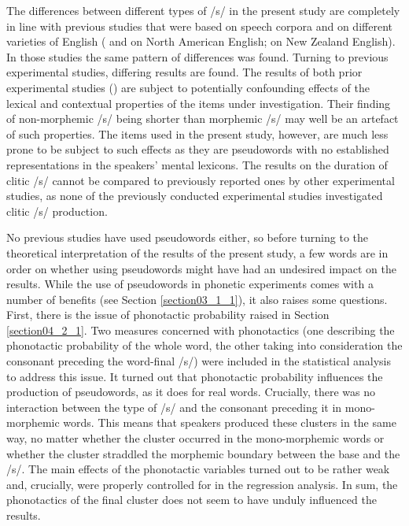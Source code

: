 The differences between different types of /s/ in the present study are completely in line with previous studies that were based on speech corpora and on different varieties of English (\cite{Plag2017} and \cite{Tomaschek2019} on North American English; \cite{Zimmermann2016} on New Zealand English). In those studies the same pattern of differences was found. Turning to previous experimental studies, differing results are found. The results of both prior experimental studies (\cite{Walsh1983, Seyfarth2017}) are subject to potentially confounding effects of the lexical and contextual properties of the items under investigation. Their finding of non-morphemic /s/ being shorter than morphemic /s/ may well be an artefact of such properties. The items used in the present study, however, are much less prone to be subject to such effects as they are pseudowords with no established representations in the speakers’ mental lexicons. The results on the duration of clitic /s/ cannot be compared to previously reported ones by other experimental studies, as none of the previously conducted experimental studies investigated clitic /s/ production.

No previous studies have used pseudowords either, so before turning to the theoretical interpretation of the results of the present study, a few words are in order on whether using pseudowords might have had an undesired impact on the results. While the use of pseudowords in phonetic experiments comes with a number of benefits (see Section \ref{section03_1_1}), it also raises some questions. First, there is the issue of phonotactic probability raised in Section \ref{section04_2_1}. Two measures concerned with phonotactics (one describing the phonotactic probability of the whole word, the other taking into consideration the consonant preceding the word-final /s/) were included in the statistical analysis to address this issue. It turned out that phonotactic probability influences the production of pseudowords, as it does for real words. Crucially, there was no interaction between the type of /s/ and the consonant preceding it in mono-morphemic words. This means that speakers produced these clusters in the same way, no matter whether the cluster occurred in the mono-morphemic words or whether the cluster straddled the morphemic boundary between the base and the /s/. The main effects of the phonotactic variables turned out to be rather weak and, crucially, were properly controlled for in the regression analysis. In sum, the phonotactics of the final cluster does not seem to have unduly influenced the results.

